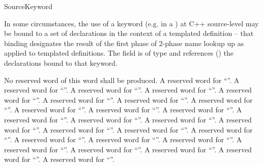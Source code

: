 \begin{Enumeration}{SourceKeyword}
\end{Enumeration}

In some circumstances, the use of a keyword (e.g.  in a ) 
at C++ source-level may be bound to a set of declarations in the context of a 
templated definition -- that binding designates the result of the first phase of 2-phase 
name lookup up as applied to templated definitions.   The  field is of 
type  and references () the declarations bound 
to that keyword.


 No reserved word of this word shall be produced.
 A reserved word for ``''.
 A reserved word for ``''.
 A reserved word for ``''.
 A reserved word for ``''.
 A reserved word for ``''.
 A reserved word for ``''.
 A reserved word for ``''.
 A reserved word for ``''.
 A reserved word for ``''.
 A reserved word for ``''.
 A reserved word for ``''.
 A reserved word for ``''.
 A reserved word for ``''.
 A reserved word for ``''.
 A reserved word for ``''.
 A reserved word for ``''.
 A reserved word for ``''.
 A reserved word for ``''.
 A reserved word for ``''.
 A reserved word for ``''.
 A reserved word for ``''.
 A reserved word for ``''.
 A reserved word for ``''.
 A reserved word for ``''.
 A reserved word for ``''.
 A reserved word for ``''.
